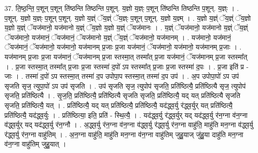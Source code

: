 \documentclass[17pt]{extarticle}
\begin{document}
37. ति॒ष्ठ॒न्ति॒ प॒शून् प॒शून् ति॑ष्ठन्ति तिष्ठन्ति प॒शून्. य॒ज्ञो य॒ज्ञ्ः प॒शून् ति॑ष्ठन्ति तिष्ठन्ति प॒शून्. य॒ज्ञ्ः । . प॒शून्. य॒ज्ञो य॒ज्ञ्ः प॒शून् प॒शून्. य॒ज्ञो य॒ज्ञ्ं ॅय॒ज्ञ्ं ॅय॒ज्ञ्ः प॒शून् प॒शून्. य॒ज्ञो य॒ज्ञ्म् । . य॒ज्ञो य॒ज्ञ्ं ॅय॒ज्ञ्ं ॅय॒ज्ञो य॒ज्ञो य॒ज्ञ्ं ॅयज॑मानो॒ यज॑मानो य॒ज्ञ्ं ॅय॒ज्ञो य॒ज्ञो य॒ज्ञ्ं ॅयज॑मानः । . य॒ज्ञ्ं ॅयज॑मानो॒ यज॑मानो य॒ज्ञ्ं ॅय॒ज्ञ्ं ॅयज॑मानो॒ यज॑मानं॒ ॅयज॑मानं॒ ॅयज॑मानो य॒ज्ञ्ं ॅय॒ज्ञ्ं ॅयज॑मानो॒ यज॑मानम् । . यज॑मानो॒ यज॑मानं॒ ॅयज॑मानं॒ ॅयज॑मानो॒ यज॑मानो॒ यज॑मानम् प्र॒जाः प्र॒जा यज॑मानं॒ ॅयज॑मानो॒ यज॑मानो॒ यज॑मानम् प्र॒जाः । . यज॑मानम् प्र॒जाः प्र॒जा यज॑मानं॒ ॅयज॑मानम् प्र॒जा स्तस्मा॒त् तस्मा᳚त् प्र॒जा यज॑मानं॒ ॅयज॑मानम् प्र॒जा स्तस्मा᳚त् । . प्र॒जा स्तस्मा॒त् तस्मा᳚त् प्र॒जाः प्र॒जा स्तस्मा॑ द॒पो॑ ऽप स्तस्मा᳚त् प्र॒जाः प्र॒जा स्तस्मा॑ द॒पः । . प्र॒जा इति॑ प्र - जाः । . तस्मा॑ द॒पो॑ ऽप स्तस्मा॒त् तस्मा॑ द॒प उपोपा॒प स्तस्मा॒त् तस्मा॑ द॒प उप॑ । . अ॒प उपोपा॒पो॑ ऽप उप॑ सृजति सृज॒ त्युपा॒पो॑ ऽप उप॑ सृजति । . उप॑ सृजति सृज॒ त्युपोप॑ सृजति॒ प्रति॑ष्ठित्यै॒ प्रति॑ष्ठित्यै सृज॒ त्युपोप॑ सृजति॒ प्रति॑ष्ठित्यै । . सृ॒ज॒ति॒ प्रति॑ष्ठित्यै॒ प्रति॑ष्ठित्यै सृजति सृजति॒ प्रति॑ष्ठित्यै॒ यद् यत् प्रति॑ष्ठित्यै सृजति सृजति॒ प्रति॑ष्ठित्यै॒ यत् । . प्रति॑ष्ठित्यै॒ यद् यत् प्रति॑ष्ठित्यै॒ प्रति॑ष्ठित्यै॒ यद॑द्ध्व॒र्यु र॑द्ध्व॒र्युर् यत् प्रति॑ष्ठित्यै॒ प्रति॑ष्ठित्यै॒ यद॑द्ध्व॒र्युः । . प्रति॑ष्ठित्या॒ इति॒ प्रति॑ - स्थि॒त्यै॒ । . यद॑द्ध्व॒र्यु र॑द्ध्व॒र्युर् यद् यद॑द्ध्व॒र्यु र॑न॒ग्ना व॑न॒ग्ना व॑द्ध्व॒र्युर् यद् यद॑द्ध्व॒र्यु र॑न॒ग्नौ । . अ॒द्ध्व॒र्यु र॑न॒ग्ना व॑न॒ग्ना व॑द्ध्व॒र्यु र॑द्ध्व॒र्यु र॑न॒ग्ना वाहु॑ति॒ माहु॑ति मन॒ग्ना व॑द्ध्व॒र्यु र॑द्ध्व॒र्यु र॑न॒ग्ना वाहु॑तिम् । . अ॒न॒ग्ना वाहु॑ति॒ माहु॑ति मन॒ग्ना व॑न॒ग्ना वाहु॑तिम् जुहु॒याज् जु॑हु॒या दाहु॑ति मन॒ग्ना व॑न॒ग्ना वाहु॑तिम् जुहु॒यात् । \newline
\end{document}
